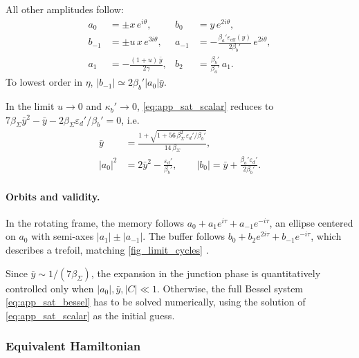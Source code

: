 \documentclass[aps,prx,reprint,floatfix,amsmath,amssymb,longbibliography]{revtex4-2}
\begin{document}
All other amplitudes follow:
\begin{equation}
\begin{aligned}
    a_0 &= \pm x\,e^{i\theta}, & b_0 &= y\,e^{2i\theta},\\
    b_{-1} &= \pm u\,x\,e^{3i\theta}, & a_{-1} &= -\frac{\beta_a'\varepsilon_\text{eff}(y)}{2\beta_b'}\,e^{2i\theta},\\
    a_1 &= -\frac{(1+u)\,\bar y}{2\gamma}, & b_2 &= \frac{\beta_b'}{\beta_a'}\,a_1 .
\end{aligned}
\label{eq:hb_analytic_complex}
\end{equation}
To lowest order in $\eta$, $|b_{-1}|\simeq2\beta_b'|a_0|\bar y$.

In the limit $u\to0$ and $\kappa_b'\to0$, \cref{eq:app_sat_scalar} reduces to $7\beta_\Sigma \bar y^2-\bar y-2\beta_\Sigma\varepsilon_d'/\beta_b'=0$, i.e.
\begin{equation}
\begin{split}
    \bar y &= \frac{1+\sqrt{1+56\,\beta_\Sigma^2\,\varepsilon_d'/\beta_b'}}{14\,\beta_\Sigma},\\
    |a_0|^2 &= 2\bar y^2 - \frac{\varepsilon_d'}{\beta_b'},
    \qquad |b_0| = \bar y + \frac{\beta_a'\varepsilon_d'}{2\beta_b'} .
\end{split}
\label{eq:hb_analytic_simple}
\end{equation}

\paragraph*{Orbits and validity.}
In the rotating frame, the memory follows $a_0+a_1e^{i\tau}+a_{-1}e^{-i\tau}$, an ellipse centered on $a_0$ with semi-axes $|a_1|\pm|a_{-1}|$. The buffer follows $b_0+b_2e^{2i\tau}+b_{-1}e^{-i\tau}$, which describes a trefoil, matching \cref{fig_limit_cycles} .

Since $\bar y\sim1/(7\beta_\Sigma)$, the expansion in the junction phase is quantitatively controlled only when $|a_0|,\bar y,|C|\ll1$. Otherwise, the full Bessel system \cref{eq:app_sat_bessel} has to be solved numerically, using the solution of \cref{eq:app_sat_scalar} as the initial guess.

\subsubsection{Equivalent Hamiltonian}
\label{app:sat_hamiltonian}
\end{document}
